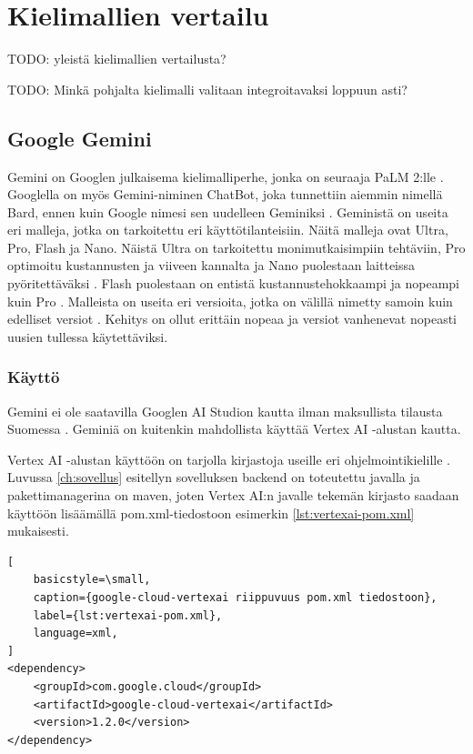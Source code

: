 \chapter{Kielimallien vertailu}
\label{ch:vertailu}

TODO: yleistä kielimallien vertailusta?

TODO: Minkä pohjalta kielimalli valitaan integroitavaksi loppuun asti?

\section{Google Gemini}

Gemini on Googlen julkaisema kielimalliperhe, jonka on seuraaja PaLM 2:lle
\parencite{googleKeynote2023}. Googlella on myös Gemini-niminen ChatBot, joka
tunnettiin aiemmin nimellä Bard, ennen kuin Google nimesi sen uudelleen
Geminiksi \parencite{geminiUpdates}. Geministä on useita eri malleja, jotka on
tarkoitettu eri käyttötilanteisiin. Näitä malleja ovat Ultra, Pro, Flash ja
Nano. \parencite{googleDeepmindGemini} Näistä Ultra on tarkoitettu
monimutkaisimpiin tehtäviin, Pro optimoitu kustannusten ja viiveen kannalta ja
Nano puolestaan laitteissa pyöritettäväksi
\parencite{googleDeepmindGeminiv1report}. Flash puolestaan on entistä
kustannustehokkaampi ja nopeampi kuin Pro \parencite{googleKeynote2024}.
Malleista on useita eri versioita, jotka on välillä nimetty samoin kuin
edelliset versiot \parencite{googleDeepmindGeminiv1_5report}. Kehitys on ollut
erittäin nopeaa ja versiot vanhenevat nopeasti uusien tullessa käytettäviksi.

\subsection{Käyttö}

Gemini ei ole saatavilla Googlen AI Studion kautta ilman maksullista tilausta
Suomessa \parencite{googleAiAvailableRegions}. Geminiä on kuitenkin mahdollista
käyttää Vertex AI -alustan kautta.

Vertex AI -alustan käyttöön on tarjolla kirjastoja useille eri
ohjelmointikielille \parencite{vertexAiGenerativeAiQuickstart}. Luvussa
\ref{ch:sovellus} esitellyn sovelluksen backend on toteutettu javalla ja
pakettimanagerina on maven, joten Vertex AI:n javalle tekemän kirjasto saadaan
käyttöön lisäämällä pom.xml-tiedostoon esimerkin \ref{lst:vertexai-pom.xml}
mukaisesti.

\begin{lstlisting}[
    basicstyle=\small,
    caption={google-cloud-vertexai riippuvuus pom.xml tiedostoon},
    label={lst:vertexai-pom.xml},
    language=xml,
]
<dependency>
    <groupId>com.google.cloud</groupId>
    <artifactId>google-cloud-vertexai</artifactId>
    <version>1.2.0</version>
</dependency>
\end{lstlisting}

